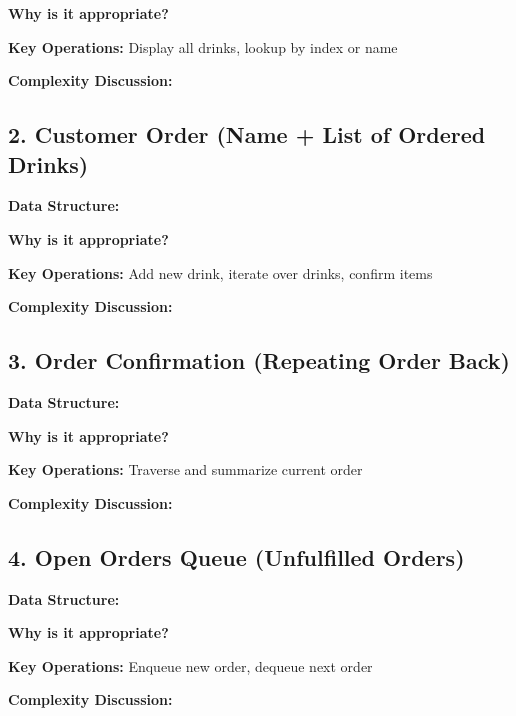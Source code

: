 \documentclass[12pt]{article}
\begin{document}
\textbf{Why is it appropriate?} \hrulefill

\vspace{1em}
\textbf{Key Operations:} Display all drinks, lookup by index or name

\vspace{1em}
\textbf{Complexity Discussion:} \hrulefill

\vspace{2em}

\subsection*{2. Customer Order (Name + List of Ordered Drinks)}
\textbf{Data Structure:} \hrulefill

\textbf{Why is it appropriate?} \hrulefill

\vspace{1em}
\textbf{Key Operations:} Add new drink, iterate over drinks, confirm items

\vspace{1em}
\textbf{Complexity Discussion:} \hrulefill

\vspace{2em}

\subsection*{3. Order Confirmation (Repeating Order Back)}
\textbf{Data Structure:} \hrulefill

\textbf{Why is it appropriate?} \hrulefill

\vspace{1em}
\textbf{Key Operations:} Traverse and summarize current order

\vspace{1em}
\textbf{Complexity Discussion:} \hrulefill

\vspace{2em}

\subsection*{4. Open Orders Queue (Unfulfilled Orders)}
\textbf{Data Structure:} \hrulefill

\textbf{Why is it appropriate?} \hrulefill

\vspace{1em}
\textbf{Key Operations:} Enqueue new order, dequeue next order

\vspace{1em}
\textbf{Complexity Discussion:} \hrulefill
\end{document}
